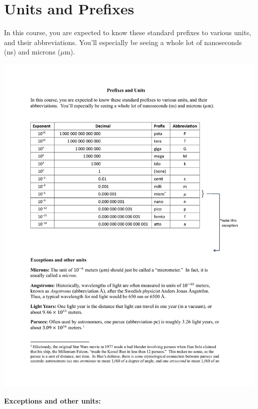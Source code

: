 \section{Units and Prefixes}

In this course, you are expected to know these standard prefixes to various units, and their abbreviations.  You'll especially be seeing a whole lot of nanoseconds (ns) and microns ($\mu$m).

\centerline{\hspace{0.5in}\includegraphics{appendices/si_prefixes.pdf}}

\vspace{-0.70in}
\textbf{Exceptions and other units:}

